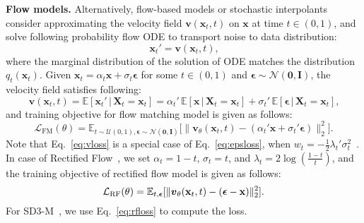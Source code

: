 \vspace{0.05in}
\noindent
{\bf Flow models.}
Alternatively, flow-based models or stochastic interpolants~\citep{lipman2022flow, albergo2023stochastic, ma2024sit} consider approximating the velocity field $\boldsymbol{v}(\mathbf{x}_t,t)$ on $\mathbf{x}$ at time $t\in(0,1)$, and solve following probability flow ODE to transport noise to data distribution:
\begin{equation}
    \mathbf{x}_t' = \boldsymbol{v}(\mathbf{x}_t, t)\text{,}
\end{equation}
where the marginal distribution of the solution of ODE matches the distribution $q_t(\mathbf{x}_t)$.
Given $\mathbf{x}_t=\alpha_t\mathbf{x}+\sigma_t\boldsymbol{\epsilon}$ for some $t\in(0,1)$ and $\boldsymbol{\epsilon}\sim\mathcal{N}(\boldsymbol{0}, \mathbf{I})$, the velocity field satisfies following:
\begin{equation}
    \boldsymbol{v}(\mathbf{x}_t, t) = \mathbb{E}[{\mathbf{x}}_t' \,|\, \mathbf{X}_t = \mathbf{x}_t] = \alpha_t'\, \mathbb{E}[\mathbf{x} \,|\, \mathbf{X}_t = \mathbf{x}_t] + \sigma_t'\,\mathbb{E}[\boldsymbol{\epsilon}\,|\, \mathbf{X}_t= \mathbf{x}_t]\text{,}
\end{equation}
and training objective for flow matching model is given as follows:
\begin{equation}\label{eq:vloss}
    \mathcal{L}_{\textrm{FM}}(\theta) = \mathbb{E}_{t\sim\mathcal{U}(0,1), \boldsymbol{\epsilon}\sim\mathcal{N}(\boldsymbol{0}, \mathbf{I})}\big[ \| \boldsymbol{v}_\theta(\mathbf{x}_t,t) - (\alpha_t' \mathbf{x} + \sigma_t'\boldsymbol{\epsilon})\|_2^2\big]\text{.}
\end{equation}
Note that Eq.~\eqref{eq:vloss} is a special case of Eq.~\eqref{eq:epsloss}, when $w_t=-\tfrac{1}{2}\lambda_t'\sigma_t^2$~\citep{kingma2023understanding, esser2024scaling}. 
In case of Rectified Flow~\citep{lipman2022flow}, we set $\alpha_t= 1-t$, $\sigma_t = t$, and $\lambda_t = 2 \log (\tfrac{1-t}{t})$, and the training objective of rectified flow model is given as follows:
\begin{equation}\label{eq:rfloss}
    \mathcal{L}_{\textrm{RF}}(\theta) = \mathbb{E}_{t, \boldsymbol{\epsilon}}[\|\boldsymbol{v}_\theta(\mathbf{x}_t,t) - (\boldsymbol{\epsilon} - \mathbf{x})\|_2^2]\text{.}
\end{equation}
For SD3-M~\citep{esser2024scaling}, we use Eq.~\eqref{eq:rfloss} to compute the loss.

